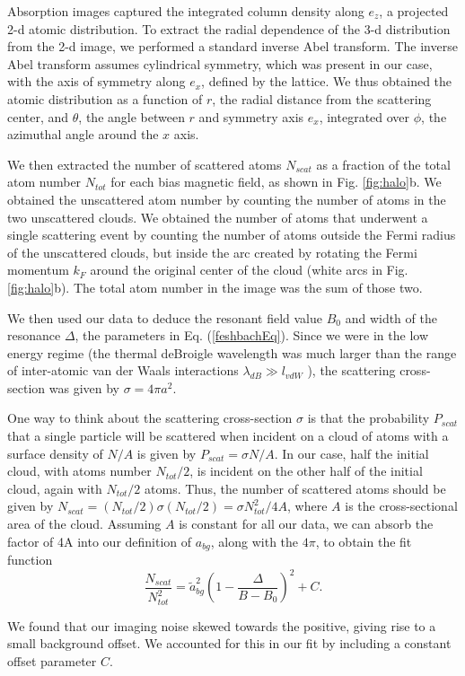 \documentclass[12pt]{iopart}
\begin{document}
\par Absorption images captured the integrated column density along $e_z$, a projected 2-d atomic distribution. To extract the radial dependence of the 3-d distribution from the 2-d image, we performed a standard inverse Abel transform. The inverse Abel transform assumes cylindrical symmetry, which was present in our case, with the axis of symmetry along $e_x$, defined by the lattice. We thus obtained the atomic distribution as a function of $r$, the radial distance from the scattering center, and $\theta$, the angle between $r$ and symmetry axis $e_x$, integrated over $\phi$, the azimuthal angle around the $x$ axis. 
\par We then extracted the number of scattered atoms $N_{scat}$ as a fraction of the total atom number $N_{tot}$ for each bias magnetic field, as shown in Fig. \ref{fig:halo}b. We obtained the unscattered atom number by counting the number of atoms in the two unscattered clouds. We obtained the number of atoms that underwent a single scattering event by counting the number of atoms outside the Fermi radius of the unscattered clouds, but inside the arc created by rotating the Fermi momentum $k_F$ around the original center of the cloud (white arcs in Fig. \ref{fig:halo}b). The total atom number in the image was the sum of those two.
\par We then used our data to deduce the resonant field value $B_0$ and width of the resonance  $\Delta$, the parameters in Eq. (\ref{feshbachEq}).  Since we were in the low energy regime (the thermal deBroigle wavelength was much larger than the range of inter-atomic van der Waals interactions $\lambda_{dB}\gg l_{vdW}$ \cite{Williams2012}), the scattering cross-section was given by $\sigma=4\pi a^2$. 
\par One way to think about the scattering cross-section $\sigma$ is that the probability $P_{scat}$ that a single particle will be scattered when incident on a cloud of atoms with a surface density of $N/A$ is given by $P_{scat}=\sigma N/A$. In our case, half the initial cloud, with atoms number $N_{tot}/2$, is incident on the other half of the initial cloud, again with $N_{tot}/2$ atoms. Thus, the number of scattered atoms should be given by $N_{scat}= (N_{tot}/2) \sigma  (N_{tot}/2)=\sigma N_{tot}^2/4A$, where $A$ is the cross-sectional area of the cloud. Assuming $A$ is constant for all our data, we can absorb the factor of 4A into our definition of $a_{bg}$, along with the $4\pi$, to obtain the fit function
\begin{equation}
\frac{N_{scat}}{N_{tot}^2}=\tilde{a}_{bg}^2\left(1-\frac{\Delta}{B-B_0}\right)^2 + C.
\label{eq:fit}
\end{equation}
\par We found that our imaging noise skewed towards the positive, giving rise to a small background offset. We accounted for this in our fit by including a constant offset parameter $C$. 
\end{document}
